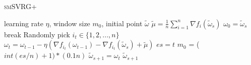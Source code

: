 \documentclass[conference]{IEEEtran}
\begin{document}
\begin{itemize}
 

 \begin{algorithm}[t]
 	\caption{\textsc{smSVRG+}}
	\label{smSVRG+}
	\begin{algorithmic}[1]
	\Require learning rate $\eta$, window size $m_0$, initial point $\tilde{\omega}$
		\State $\tilde{\mu} = \frac{1}{n}\sum\limits_{i=1}^{n}\nabla f_{i}(\tilde{\omega}_{s})$
		\State $\omega_0 = \tilde{\omega}_s$
			\State break
			\EndIf
			\State Randomly pick $i_t\in\{1, 2, ..., n\}$
			\State $\omega_t = \omega_{t-1} - \eta(\nabla f_{i_t}(\omega_{t-1}) - \nabla f_{i_t}(\tilde{\omega}_s)+\tilde{\mu})$
		\EndFor
		\State $es = t$	
		\State $m_0$ = ($int(es/n)+1) * (0.1n)$
		\State $\tilde{\omega}_{s+1} = \omega_{t}$
	\EndFor
	\State \Return $\tilde{\omega}_{s+1}$
	\end{algorithmic}
\end{algorithm}
 

\end{itemize}
\end{document}
